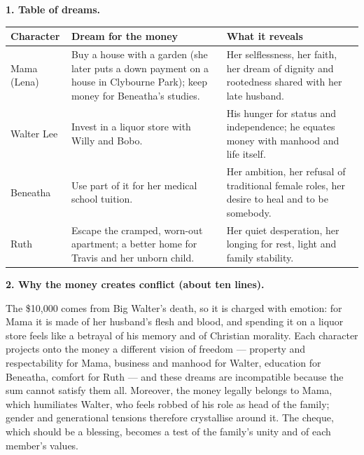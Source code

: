 \documentclass[11pt]{article}
\begin{document}
\begin{corrige}
\textbf{1. Table of dreams.}
\begin{center}
\begin{tabularx}{\linewidth}{|l|X|X|}
\hline
\rowcolor{popblueL} \textbf{Character} & \textbf{Dream for the money} & \textbf{What it reveals} \\
\hline
Mama (Lena) & Buy a house with a garden (she later puts a down payment on a house in Clybourne Park); keep money for Beneatha's studies. & Her selflessness, her faith, her dream of dignity and rootedness shared with her late husband. \\
\hline
Walter Lee & Invest in a liquor store with Willy and Bobo. & His hunger for status and independence; he equates money with manhood and life itself. \\
\hline
Beneatha & Use part of it for her medical school tuition. & Her ambition, her refusal of traditional female roles, her desire to heal and to be somebody. \\
\hline
Ruth & Escape the cramped, worn-out apartment; a better home for Travis and her unborn child. & Her quiet desperation, her longing for rest, light and family stability. \\
\hline
\end{tabularx}
\end{center}

\textbf{2. Why the money creates conflict (about ten lines).}

The \$10,000 comes from Big Walter's death, so it is charged with emotion: for Mama it is made of her husband's flesh and blood, and spending it on a liquor store feels like a betrayal of his memory and of Christian morality. Each character projects onto the money a different vision of freedom — property and respectability for Mama, business and manhood for Walter, education for Beneatha, comfort for Ruth — and these dreams are incompatible because the sum cannot satisfy them all. Moreover, the money legally belongs to Mama, which humiliates Walter, who feels robbed of his role as head of the family; gender and generational tensions therefore crystallise around it. The cheque, which should be a blessing, becomes a test of the family's unity and of each member's values.
\end{corrige}
\end{document}
